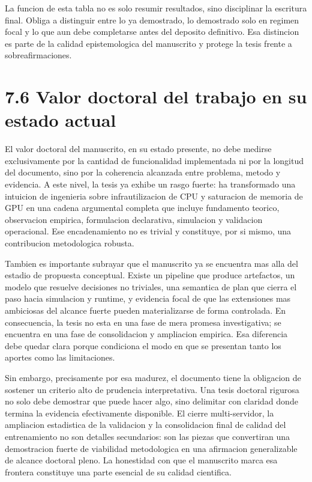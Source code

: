 La funcion de esta tabla no es solo resumir resultados, sino disciplinar la escritura final. Obliga a distinguir entre lo ya demostrado, lo demostrado solo en regimen focal y lo que aun debe completarse antes del deposito definitivo. Esa distincion es parte de la calidad epistemologica del manuscrito y protege la tesis frente a sobreafirmaciones.

\section{7.6 Valor doctoral del trabajo en su estado actual}
El valor doctoral del manuscrito, en su estado presente, no debe medirse exclusivamente por la cantidad de funcionalidad implementada ni por la longitud del documento, sino por la coherencia alcanzada entre problema, metodo y evidencia. A este nivel, la tesis ya exhibe un rasgo fuerte: ha transformado una intuicion de ingenieria sobre infrautilizacion de CPU y saturacion de memoria de GPU en una cadena argumental completa que incluye fundamento teorico, observacion empirica, formulacion declarativa, simulacion y validacion operacional. Ese encadenamiento no es trivial y constituye, por si mismo, una contribucion metodologica robusta.

Tambien es importante subrayar que el manuscrito ya se encuentra mas alla del estadio de propuesta conceptual. Existe un pipeline que produce artefactos, un modelo que resuelve decisiones no triviales, una semantica de plan que cierra el paso hacia simulacion y runtime, y evidencia focal de que las extensiones mas ambiciosas del alcance fuerte pueden materializarse de forma controlada. En consecuencia, la tesis no esta en una fase de mera promesa investigativa; se encuentra en una fase de consolidacion y ampliacion empirica. Esa diferencia debe quedar clara porque condiciona el modo en que se presentan tanto los aportes como las limitaciones.

Sin embargo, precisamente por esa madurez, el documento tiene la obligacion de sostener un criterio alto de prudencia interpretativa. Una tesis doctoral rigurosa no solo debe demostrar que puede hacer algo, sino delimitar con claridad donde termina la evidencia efectivamente disponible. El cierre multi-servidor, la ampliacion estadistica de la validacion y la consolidacion final de calidad del entrenamiento no son detalles secundarios: son las piezas que convertiran una demostracion fuerte de viabilidad metodologica en una afirmacion generalizable de alcance doctoral pleno. La honestidad con que el manuscrito marca esa frontera constituye una parte esencial de su calidad cientifica.

